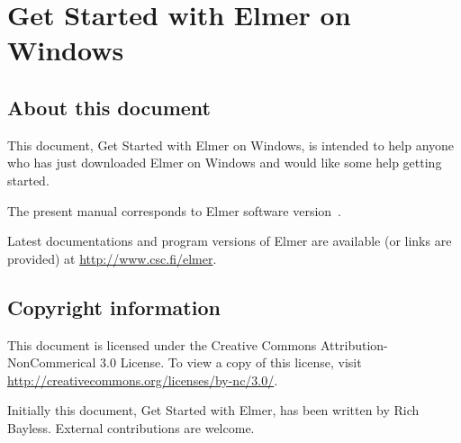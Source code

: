 \chapter*{Get Started with Elmer on Windows}

\section*{About this document}

This document, Get Started with Elmer on Windows, is intended to help
anyone who has just downloaded Elmer on Windows and would like some
help getting started. 


The present manual corresponds to Elmer software version~\elmerversion{}.

Latest documentations and program versions of Elmer are available (or links are provided) at 
\url{http://www.csc.fi/elmer}. 

\section*{Copyright information}

This document is licensed under the Creative Commons Attribution-NonCommerical 3.0 License. 
To view a copy of this license, visit \url{http://creativecommons.org/licenses/by-nc/3.0/}.

Initially this document, Get Started with Elmer, has been written by Rich Bayless.
External contributions are welcome.



